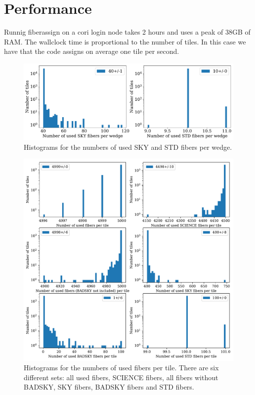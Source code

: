 \documentclass{article}
\begin{document}
\section{Performance}
Runnig fiberassign on a cori login node takes 2 hours and  uses a
peak of 38GB of RAM.
The wallclock time is proportional to the number
of tiles. In this case we have that the code assigns on average one
tile per second. 

\begin{figure}[!h]
\begin{center}
\begin{center}
\includegraphics[scale=0.4]{used_fibers_per_wedge.pdf}
\end{center}
\caption{
Histograms for the numbers of used SKY and STD fibers per wedge. 
\label{fig:used_fibers}}
\end{center}
\end{figure}

\begin{figure}[!h]
\begin{center}
\begin{center}
\includegraphics[scale=0.6]{used_fibers.pdf}
\end{center}
\caption{
Histograms for the numbers of used fibers per tile. There are six different sets: all used fibers, SCIENCE fibers, all fibers without BADSKY, SKY fibers, BADSKY fibers and STD fibers. 
\label{fig:used_fibers}}
\end{center}
\end{figure}
\end{document}
